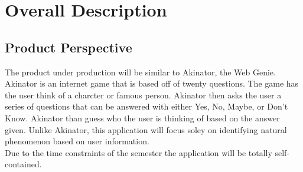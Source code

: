 \documentclass[]{article}
\begin{document}

\section{Overall Description}
\label{sec:overall_description}


\subsection{Product Perspective}
\label{sub:product_perspective}
The product under production will be similar to Akinator, the Web Genie. Akinator is an internet game that is based off of twenty questions. The game has the user think of a charcter or famous person. Akinator then asks the user a series of questions that can be answered with either Yes, No, Maybe, or Don't Know. Akinator than guess who the user is thinking of based on the answer given.  Unlike Akinator, this application will focus soley on identifying natural phenomenon based on user information.\\
Due to the time constraints of the semester the application will be totally self-contained. 
\end{document}
